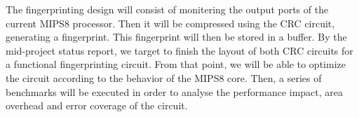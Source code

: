 \documentclass[dvips,12pt]{article}
\begin{document}
The fingerprinting design will consist of monitering the output ports of the current MIPS8 processor. 
Then it will be compressed using the CRC circuit, generating a fingerprint. This fingerprint will then be
stored in a buffer.
By the mid-project status report, we target to finish the layout of both CRC circuits for a functional
fingerprinting circuit. From that point, we will be able to optimize the circuit according to the behavior
of the MIPS8 core. Then, a series of benchmarks will be executed in order to analyse the performance
impact, area overhead and error coverage of the circuit.
\end{document}
